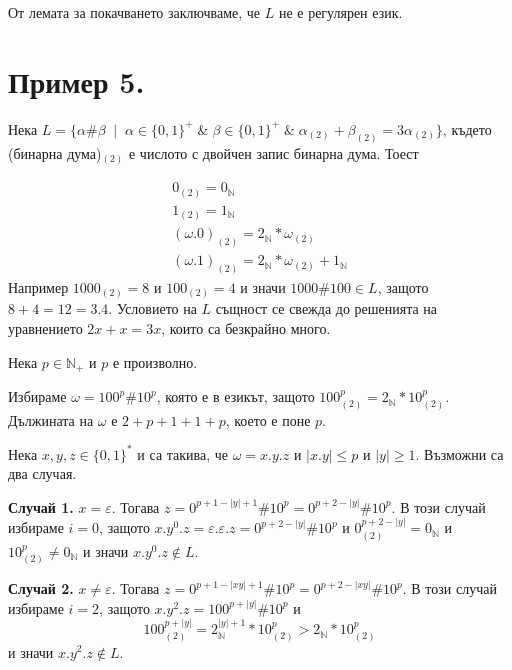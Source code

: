 \documentclass[12pt]{article}
\begin{document}
\vspace*{5mm}

\par От лемата за покачването заключваме, че \(L\) не е регулярен език.

\section{Пример 5.}
Нека \(L = \{\alpha\#\beta \;\mid\; \alpha \in \{0, 1\}^+ \;\&\; \beta \in \{0, 1\}^+ \;\&\; \alpha_{(2)} + \beta_{(2)} = 3 \alpha_{(2)}\}\), където (бинарна дума)\(_{(2)}\) е числото с двойчен запис бинарна дума. Тоест

\begin{align*}
    0_{(2)} = 0_{\mathbb{N}} \\
    1_{(2)} = 1_{\mathbb{N}} \\
    (\omega.0)_{(2)} = 2_{\mathbb{N}} * \omega_{(2)} \\
    (\omega.1)_{(2)} = 2_{\mathbb{N}} * \omega_{(2)} + 1_{\mathbb{N}}
\end{align*}
Например \(1000_{(2)} = 8\) и \(100_{(2)} = 4\) и значи \(1000\#100 \in L\), защото \(8 + 4 = 12 = 3.4\).
Условието на \(L\) същност се свежда до решенията на уравнението \(2x + x = 3x\), които са безкрайно много. 

\vspace*{5mm}

\par Нека \(p \in \mathbb{N}_+\) и \(p\) е произволно.

\vspace*{5mm}

\par Избираме \(\omega = 100^p\#10^p\), която е в езикът, защото \(100^p_{(2)} = 2_\mathbb{N} * 10^p_{(2)}\).
Дължината на \(\omega\) е \(2 + p + 1 + 1 + p\), което е поне \(p\).

\vspace*{5mm}

\par Нека \(x, y, z \in \{0, 1\}^*\) и са такива, че \(\omega = x.y.z\) и \(|x.y| \leq p\) и \(|y| \geq 1\).
Възможни са два случая.

\vspace*{5mm}

\par \textbf{Случай 1.} \(x = \varepsilon\). Тогава \(z = 0^{p + 1 - |y| + 1}\#10^p = 0^{p + 2 - |y|}\#10^p\).
В този случай избираме \(i = 0\), защото \(x.y^0.z = \varepsilon.\varepsilon.z = 0^{p + 2 - |y|}\#10^p\) и \(0^{p + 2 - |y|}_{(2)} = 0_\mathbb{N}\)  и \(10^p_{(2)} \neq 0_\mathbb{N}\) и значи \(x.y^0.z \notin L\).

\vspace*{5mm}

\par \textbf{Случай 2.} \(x \neq \varepsilon\). Тогава \(z = 0^{p + 1 - |xy| + 1}\#10^p = 0^{p + 2 - |xy|}\#10^p\).
В този случай избираме \(i = 2\), защото \(x.y^2.z = 100^{p + |y|}\#10^p\) и \[100^{p + |y|}_{(2)} = 2^{|y| + 1}_\mathbb{N} * 10^p_{(2)} > 2_\mathbb{N} * 10^p_{(2)}\] и значи \(x.y^2.z \notin L\).
\end{document}
